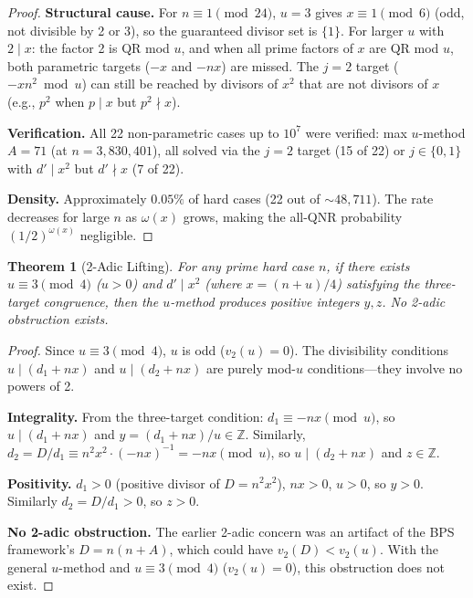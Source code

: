 \documentclass[11pt,a4paper]{article}
\theoremstyle{plain}
\newtheorem{theorem}{Theorem}[section]
\theoremstyle{plain}
\theoremstyle{definition}
\numberwithin{equation}{section}
\begin{document}
\begin{proof}
\textbf{Structural cause.} For $n \equiv 1 \pmod{24}$, $u = 3$ gives $x \equiv 1 \pmod{6}$ (odd, not divisible by 2 or 3), so the guaranteed divisor set is $\{1\}$. For larger $u$ with $2 \mid x$: the factor 2 is QR mod $u$, and when all prime factors of $x$ are QR mod $u$, both parametric targets ($-x$ and $-nx$) are missed. The $j = 2$ target ($-xn^2 \bmod u$) can still be reached by divisors of $x^2$ that are not divisors of $x$ (e.g., $p^2$ when $p \mid x$ but $p^2 \nmid x$).

\textbf{Verification.} All 22 non-parametric cases up to $10^7$ were verified: max $u$-method $A = 71$ (at $n = 3{,}830{,}401$), all solved via the $j = 2$ target (15 of 22) or $j \in \{0, 1\}$ with $d' \mid x^2$ but $d' \nmid x$ (7 of 22).

\textbf{Density.} Approximately $0.05\%$ of hard cases (22 out of $\sim 48{,}711$). The rate decreases for large $n$ as $\omega(x)$ grows, making the all-QNR probability $(1/2)^{\omega(x)}$ negligible.
\end{proof}

\begin{theorem}[2-Adic Lifting]\label{thm:2adic}
For any prime hard case $n$, if there exists $u \equiv 3 \pmod{4}$ ($u > 0$) and $d' \mid x^2$ (where $x = (n+u)/4$) satisfying the three-target congruence, then the $u$-method produces \emph{positive integers} $y, z$. No 2-adic obstruction exists.
\end{theorem}

\begin{proof}
Since $u \equiv 3 \pmod{4}$, $u$ is odd ($v_2(u) = 0$). The divisibility conditions $u \mid (d_1 + nx)$ and $u \mid (d_2 + nx)$ are purely mod-$u$ conditions---they involve no powers of 2.

\textbf{Integrality.} From the three-target condition: $d_1 \equiv -nx \pmod{u}$, so $u \mid (d_1 + nx)$ and $y = (d_1 + nx)/u \in \mathbb{Z}$. Similarly, $d_2 = D/d_1 \equiv n^2 x^2 \cdot (-nx)^{-1} = -nx \pmod{u}$, so $u \mid (d_2 + nx)$ and $z \in \mathbb{Z}$.

\textbf{Positivity.} $d_1 > 0$ (positive divisor of $D = n^2 x^2$), $nx > 0$, $u > 0$, so $y > 0$. Similarly $d_2 = D/d_1 > 0$, so $z > 0$.

\textbf{No 2-adic obstruction.} The earlier 2-adic concern was an artifact of the BPS framework's $D = n(n+A)$, which could have $v_2(D) < v_2(u)$. With the general $u$-method and $u \equiv 3 \pmod{4}$ ($v_2(u) = 0$), this obstruction does not exist.
\end{proof}
\end{document}
